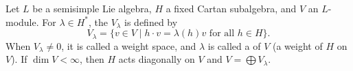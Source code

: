 Let $L$ be a semisimple Lie algebra, $H$ a fixed Cartan subalgebra, and $V$ an $L$-module. For $\lambda \in H^*$, the  $V_\lambda$ is defined by
$$V_\lambda = \{v \in V \mid h \cdot v = \lambda(h)v \text{ for all } h \in H\}.$$
When $V_\lambda \neq 0$, it is called a weight space, and $\lambda$ is called a  of $V$ (a weight of $H$ on $V$). If $\dim V < \infty$, then $H$ acts diagonally on $V$ and $V = \bigoplus V_\lambda$.
